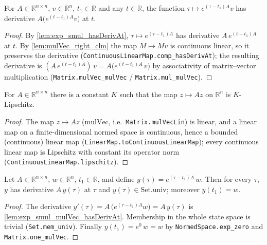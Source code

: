 \begin{lemma}
    \label{lem:exp_smul_mulVec_hasDerivAt}
    \leanok
    For $A \in \mathbb{R}^{n \times n}$, $v \in \mathbb{R}^{n}$, $t_1 \in
    \mathbb{R}$ and any $t \in \mathbb{R}$, the function $\tau \mapsto
    e^{(\tau - t_1) A} v$ has derivative $A \bigl(e^{(t - t_1)A} v\bigr)$ at $t$.
\end{lemma}
\begin{proof}
    By \cref{lem:exp_smul_hasDerivAt}, $\tau \mapsto e^{(\tau - t_1)A}$ has
    derivative $A\, e^{(t-t_1)A}$ at $t$. By \cref{lem:mulVec_right_clm} the map
    $M \mapsto Mv$ is continuous linear, so it preserves the derivative
    (\texttt{ContinuousLinearMap.comp\_hasDerivAt}); the resulting derivative is
    $(A\, e^{(t-t_1)A})\,v = A\bigl(e^{(t-t_1)A}\,v\bigr)$ by associativity of
    matrix--vector multiplication
    (\texttt{Matrix.mulVec\_mulVec} / \texttt{Matrix.mul\_mulVec}).
\end{proof}

\begin{lemma}
    \label{lem:vectorField_lipschitz}
    \leanok
    For $A \in \mathbb{R}^{n \times n}$ there is a constant $K$ such that the map
    $z \mapsto A z$ on $\mathbb{R}^{n}$ is $K$-Lipschitz.
\end{lemma}
\begin{proof}
    The map $z \mapsto A z$ ($\mathrm{mulVec}$, i.e.\ \texttt{Matrix.mulVecLin})
    is linear, and a linear map on a finite-dimensional normed space is
    continuous, hence a bounded (continuous) linear map
    (\texttt{LinearMap.toContinuousLinearMap}); every continuous linear map is
    Lipschitz with constant its operator norm
    (\texttt{ContinuousLinearMap.lipschitz}).
\end{proof}

\begin{lemma}
    \label{lem:exp_smul_isSolution}
    \leanok
    Let $A \in \mathbb{R}^{n \times n}$, $w \in \mathbb{R}^{n}$, $t_1 \in
    \mathbb{R}$, and define $y(\tau) = e^{(\tau - t_1)A}\, w$. Then for every
    $\tau$, $y$ has derivative $A\,y(\tau)$ at $\tau$ and $y(\tau) \in
    \mathrm{Set.univ}$; moreover $y(t_1) = w$.
\end{lemma}
\begin{proof}
    The derivative $y'(\tau) = A\,\bigl(e^{(\tau-t_1)A} w\bigr) = A\,y(\tau)$ is
    \cref{lem:exp_smul_mulVec_hasDerivAt}. Membership in the whole state space is
    trivial (\texttt{Set.mem\_univ}). Finally $y(t_1) = e^{0}\, w = w$ by
    \texttt{NormedSpace.exp\_zero} and \texttt{Matrix.one\_mulVec}.
\end{proof}

